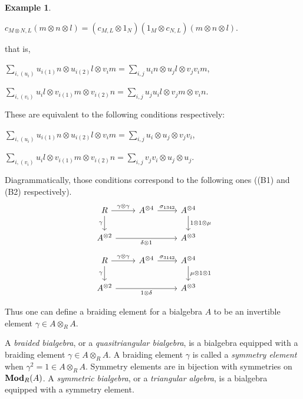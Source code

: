 \documentclass[8pt]{article}
\theoremstyle{definition}
\theoremstyle{definition}
\theoremstyle{definition}
\theoremstyle{definition}
\theoremstyle{definition}
\theoremstyle{definition}
\theoremstyle{definition}
\theoremstyle{definition}
\theoremstyle{definition}
\theoremstyle{definition}
\theoremstyle{definition}
\theoremstyle{definition}
\newtheorem{example}{Example}[section]
\theoremstyle{definition}
\theoremstyle{definition}
\theoremstyle{question}
\begin{document}
\begin{example}
\begin{center}
    $c_{M \otimes N, L}(m \otimes n \otimes l) = (c_{M,L} \otimes 1_N)(1_M \otimes c_{N,L})(m \otimes n \otimes l)$.
  \end{center}
  that is,
  \begin{center}
    $\sum \limits_{i,(u_i)} u_{i(1)} n \otimes u_{i(2)} l \otimes v_i m = \sum \limits_{i,j} u_i n \otimes u_j l \otimes v_j v_i m$,

    $\sum \limits_{i,(v_i)} u_i l \otimes v_{i(1)} m \otimes v_{i(2)} n = \sum \limits_{i,j} u_{j} u_i l \otimes v_j m \otimes v_i n$.
  \end{center}
  These are equivalent to the following conditions respectively:
  \begin{center}
      $\sum \limits_{i,(u_i)} u_{i(1)} n \otimes u_{i(2)} l \otimes v_i m = \sum \limits_{i,j} u_i \otimes u_j \otimes v_j v_i$,

      $\sum \limits_{i,(v_i)} u_i l \otimes v_{i(1)} m \otimes v_{i(2)} n = \sum \limits_{i,j} v_j v_i \otimes u_j \otimes u_j$.
  \end{center}
  Diagrammatically, those conditions correspond to the following ones ((B1) and (B2) respectively).
  \[
  \begin{tikzcd}
    R \ar[r, "\gamma \otimes \gamma"] \ar[d, "\gamma"'] & A^{\otimes 4} \ar[r, "\sigma_{1342}"] & A^{\otimes 4} \ar[d, "1 \otimes 1 \otimes \mu"] \\
    A^{\otimes 2} \ar[rr, "\delta \otimes 1"'] && A^{\otimes 3}
  \end{tikzcd}
  \]
  \[
  \begin{tikzcd}
  R \ar[r, "\gamma \otimes \gamma"] \ar[d, "\gamma"'] & A^{\otimes 4} \ar[r, "\sigma_{3142}"] & A^{\otimes 4} \ar[d, "\mu \otimes 1 \otimes 1"] \\
  A^{\otimes 2} \ar[rr, "1 \otimes \delta"'] && A^{\otimes 3}
  \end{tikzcd}
  \]

  Thus one can define a braiding element for a bialgebra $A$ to be an invertible element $\gamma \in A \otimes_R A$.

  A \emph{braided bialgebra}, or a \emph{quasitriangular bialgebra}, is a bialgebra equipped with a braiding element 
  $\gamma \in A \otimes_R A$. A braiding element $\gamma$ is called a \emph{symmetry element} when 
  $\gamma^2 = 1 \in A \otimes_R A$. Symmetry elements are in bijection with symmetries on ${\bf Mod}_R(A)$. A \emph{symmetric bialgebra},
  or a \emph{triangular algebra}, is a bialgebra equipped with a symmetry element.


\end{example}
\end{document}

